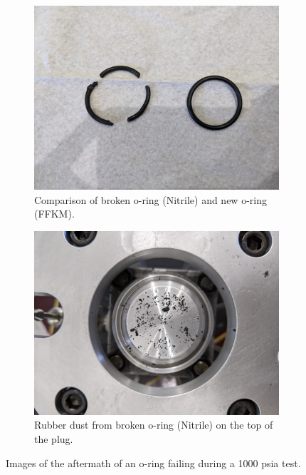 \begin{figure}[htpb]
    \vspace{16pt}
    \centering
    \begin{subfigure}[t]{0.45\textwidth}
        \centering
        \includegraphics[width=\textwidth]{design/photos/Broken_Oring_Comparison.jpg}
        \caption{Comparison of broken o-ring (Nitrile) and new o-ring (FFKM).}
        \label{fig:broken oring comp}
    \end{subfigure}
    \hfill
    \begin{subfigure}[t]{0.45\textwidth}
        \centering
        \includegraphics[width=\textwidth]{design/photos/Oring_Dust_Plug.jpg}
        \caption{Rubber dust from broken o-ring (Nitrile) on the top of the plug.}
        \label{fig:broken oring dust}
    \end{subfigure}
    \caption{Images of the aftermath of an o-ring failing during a 1000 psia test.}
    \label{fig:broken oring 2}
    \vspace{16pt}
\end{figure}
%